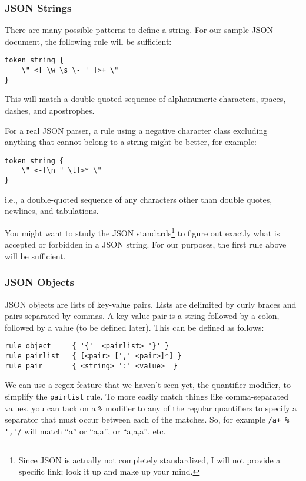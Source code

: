 \subsubsection{JSON Strings}

There are many possible patterns to define a string. For 
our sample JSON document, the following rule will be 
sufficient:

\begin{verbatim}
token string {
    \" <[ \w \s \- ' ]>+ \" 
}
\end{verbatim}

This will match a double-quoted sequence of alphanumeric 
characters, spaces, dashes, and apostrophes.

For a real JSON parser, a rule using a negative character 
class excluding anything that cannot belong to a string 
might be better, for example:

\begin{verbatim}
token string {
    \" <-[\n " \t]>* \"
}
\end{verbatim}

i.e., a double-quoted sequence of any characters other than 
double quotes, newlines, and tabulations.

You might want to study the JSON standards\footnote{Since 
JSON is actually not completely standardized, I will not provide 
a specific link; look it up and make up your mind.} to figure out 
exactly what is accepted or forbidden in a JSON string. 
For our purposes, the first rule above will be sufficient.

\subsubsection{JSON Objects}

JSON objects are lists of key-value pairs. Lists are 
delimited by curly braces and pairs separated by 
commas. A key-value pair is a string followed by a colon, 
followed by a value (to be defined later). This can be 
defined as follows:

\begin{verbatim}
rule object     { '{'  <pairlist> '}' }
rule pairlist   { [<pair> [',' <pair>]*] }
rule pair       { <string> ':' <value>  }
\end{verbatim}

We can use a regex feature that we haven't seen yet, the 
quantifier modifier, to simplify the {\tt pairlist} 
rule. To more easily match things like comma-separated 
values, you can tack on a \verb'%' modifier to any of 
the regular quantifiers to specify a separator that must 
occur between each of the matches. So, for example 
\verb"/a+ % ','/" will match ``a'' or ``a,a'', or 
``a,a,a'', etc.

